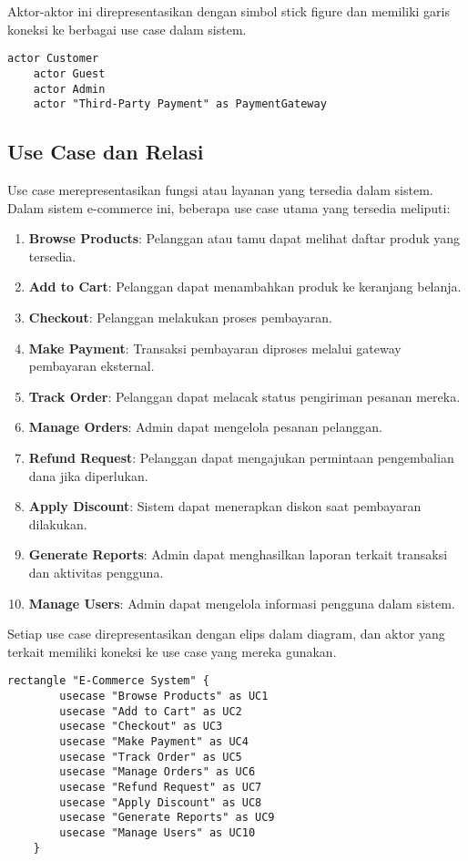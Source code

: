 Aktor-aktor ini direpresentasikan dengan simbol stick figure dan memiliki garis koneksi ke berbagai use case dalam sistem.

\begin{lstlisting}[language=puml]
	actor Customer
	actor Guest
	actor Admin
	actor "Third-Party Payment" as PaymentGateway
\end{lstlisting}

\subsection{Use Case dan Relasi}
Use case merepresentasikan fungsi atau layanan yang tersedia dalam sistem. Dalam sistem e-commerce ini, beberapa use case utama yang tersedia meliputi:
\begin{enumerate}
	\item \textbf{Browse Products}: Pelanggan atau tamu dapat melihat daftar produk yang tersedia.
	\item \textbf{Add to Cart}: Pelanggan dapat menambahkan produk ke keranjang belanja.
	\item \textbf{Checkout}: Pelanggan melakukan proses pembayaran.
	\item \textbf{Make Payment}: Transaksi pembayaran diproses melalui gateway pembayaran eksternal.
	\item \textbf{Track Order}: Pelanggan dapat melacak status pengiriman pesanan mereka.
	\item \textbf{Manage Orders}: Admin dapat mengelola pesanan pelanggan.
	\item \textbf{Refund Request}: Pelanggan dapat mengajukan permintaan pengembalian dana jika diperlukan.
	\item \textbf{Apply Discount}: Sistem dapat menerapkan diskon saat pembayaran dilakukan.
	\item \textbf{Generate Reports}: Admin dapat menghasilkan laporan terkait transaksi dan aktivitas pengguna.
	\item \textbf{Manage Users}: Admin dapat mengelola informasi pengguna dalam sistem.
\end{enumerate}

Setiap use case direpresentasikan dengan elips dalam diagram, dan aktor yang terkait memiliki koneksi ke use case yang mereka gunakan.

\begin{lstlisting}[language=puml]
	rectangle "E-Commerce System" {
		usecase "Browse Products" as UC1
		usecase "Add to Cart" as UC2
		usecase "Checkout" as UC3
		usecase "Make Payment" as UC4
		usecase "Track Order" as UC5
		usecase "Manage Orders" as UC6
		usecase "Refund Request" as UC7
		usecase "Apply Discount" as UC8
		usecase "Generate Reports" as UC9
		usecase "Manage Users" as UC10
	}
\end{lstlisting}

